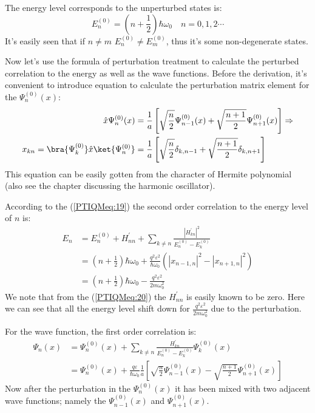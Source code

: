 The energy level corresponds to the unperturbed states is:
\begin{equation}\label{}
E_{n}^{(0)} = (n+\frac{1}{2})\hbar\omega_{0} \quad n=0,1,2\cdots
\end{equation}
It's easily seen that if $n\neq m$ $E_{n}^{(0)}\neq E_{m}^{(0)}$,
thus it's some non-degenerate states.

Now let's use the formula of perturbation treatment to calculate the
perturbed correlation to the energy as well as the wave functions.
Before the derivation, it's convenient to introduce equation to
calculate the perturbation matrix element for the
$\Psi_{n}^{(0)}(x)$:
\begin{align}\label{PTIQMeq:20}
\hat{x}\Psi_{n}^{(0)}(x) &=
\frac{1}{a}\left[\sqrt{\frac{n}{2}}\Psi_{n-1}^{(0)}(x) +
\sqrt{\frac{n+1}{2}}\Psi_{n+1}^{(0)}(x) \right] \Rightarrow
\nonumber \\
x_{kn} = \bra{\Psi_{k}^{(0)}}\hat{x}\ket{\Psi_{n}^{(0)}} &=
\frac{1}{a}\left[\sqrt{\frac{n}{2}}\delta_{k,n-1} +
\sqrt{\frac{n+1}{2}}\delta_{k,n+1} \right]
\end{align}
This equation can be easily gotten from the character of Hermite
polynomial (also see the chapter discussing the harmonic
oscillator).

According to the (\ref{PTIQMeq:19}) the second order correlation to
the energy level of $n$ is:
\begin{align}\label{}
E_{n} &= E_{n}^{(0)} + H^{'}_{nn} + \sum_{k\neq
n}\frac{|H^{'}_{kn}|^{2}}{E_{n}^{(0)} - E_{k}^{(0)}} \nonumber \\
&= (n+\frac{1}{2})\hbar\omega_{0} +
\frac{q^{2}\varepsilon^{2}}{\hbar\omega_{0}} ( |x_{n-1,n}|^{2} -
|x_{n+1,n}|^{2}) \nonumber \\
&= (n+\frac{1}{2})\hbar\omega_{0} -
\frac{q^{2}\varepsilon^{2}}{2m\omega_{0}^{2}}
\end{align}
We note that from the (\ref{PTIQMeq:20}) the $H^{'}_{nn}$ is easily
known to be zero. Here we can see that all the energy level shift
down for $\frac{q^{2}\varepsilon^{2}}{2m\omega_{0}^{2}}$ due to the
perturbation.

For the wave function, the first order correlation is:
\begin{align}\label{}
\Psi_{n}(x) &= \Psi_{n}^{(0)}(x) + \sum_{k\neq
n}\frac{H^{'}_{kn}}{E^{(0)}_{n}
- E^{(0)}_{k}}\Psi^{(0)}_{k}(x) \nonumber \\
&= \Psi_{n}^{(0)}(x) + \frac{q\varepsilon}{\hbar\omega_{0}}
\frac{1}{a}\left[\sqrt{\frac{n}{2}}\Psi_{n-1}^{(0)}(x) -
\sqrt{\frac{n+1}{2}}\Psi_{n+1}^{(0)}(x)\right]
\end{align}
Now after the perturbation in the $\Psi_{n}^{(0)}(x)$ it has been
mixed with two adjacent wave functions; namely the
$\Psi_{n-1}^{(0)}(x)$ and $\Psi_{n+1}^{(0)}(x)$.

